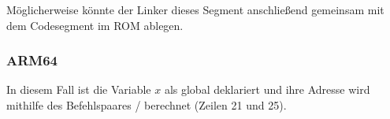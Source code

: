 Möglicherweise könnte der Linker dieses Segment anschließend gemeinsam mit dem Codesegment im ROM ablegen.


\subsubsection{ARM64}



In diesem Fall ist die Variable $x$ als global deklariert und ihre Adresse wird mithilfe des Befehlspaares
/ berechnet (Zeilen 21 und 25).

